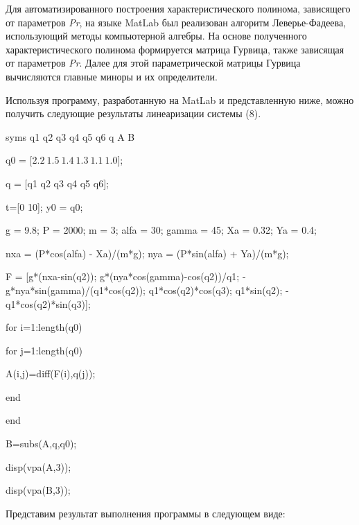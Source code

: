 Для автоматизированного построения характеристического полинома,
зависящего от параметров \emph{Pr}, на языке MatLab был реализован
алгоритм Леверье-Фадеева, использующий методы компьютерной алгебры. На
основе полученного характеристического полинома формируется матрица
Гурвица, также зависящая от параметров \emph{Pr}. Далее для этой
параметрической матрицы Гурвица вычисляются главные миноры и их
определители.

Используя программу, разработанную на MatLab и представленную ниже,
можно получить следующие результаты линеаризации системы (8).


syms q1 q2 q3 q4 q5 q6 q A B

q0 = \(\lbrack 2.2\ 1.5\ 1.4\ 1.3\ 1.1\ 1.0\rbrack\);

q = {[}q1 q2 q3 q4 q5 q6{]};

t={[}0 10{]}; y0 = q0;

g = 9.8; P = 2000; m = 3; alfa = 30; gamma = 45; Xa = 0.32; Ya = 0.4;

nxa = (P*cos(alfa) - Xa)/(m*g); nya = (P*sin(alfa) + Ya)/(m*g);

F = {[}g*(nxa-sin(q2)); g*(nya*cos(gamma)-cos(q2))/q1;
-g*nya*sin(gamma)/(q1*cos(q2)); q1*cos(q2)*cos(q3); q1*sin(q2);
-q1*cos(q2)*sin(q3){]};

for i=1:length(q0)

for j=1:length(q0)

A(i,j)=diff(F(i),q(j));

end

end

B=subs(A,q,q0);

disp(vpa(A,3));

disp(vpa(B,3));

Представим результат выполнения программы в следующем виде:

